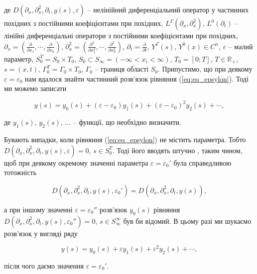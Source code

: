 де $ D(\partial_x, \partial_x^2, \partial_t, y(s), \varepsilon) $ – нелінійний диференціальний оператор у частинних
похідних з постійними коефіцієнтами при похідних, $ L^\Gamma(\partial_x, \partial_x^2) $, $ L^0(\partial_t) $ –
лінійні диференціальні оператори з постійними коефіцієнтами при похідних,
$ \partial_x = \left( \frac{\partial}{\partial x_1},\cdots , \frac{\partial}{\partial x_n}\right) $,
$ \partial_x^2 = \left( \frac{\partial^2}{\partial x_1^2},\cdots , \frac{\partial^2}{\partial x_n^2}\right) $,
$ \partial_t =  \frac{\partial}{\partial t} $,
$ Y^\Gamma(s) $, $Y^0(x) \in C ^n $, $\varepsilon$ – малий параметр,
$ S_0^T = S_0 \times T_0$, $ S_0 \subset S_\infty = \left(-\infty < x_i < \infty \right) $,
$ T_0 = \left[0; T\right] $, $ T \in \mathbb{R}_+ $,
$ s=(x,t) $, $ \Gamma_0^T = \Gamma_0 \times T_0 $, $ \Gamma_0 $  – границя області $ S_0 $.
Припустимо, що при деякому $\varepsilon = \varepsilon_0$ нам вдалося знайти частинний розв’язок рівняння (\ref{eq:eq_epsylon}). Тоді ми можемо записати

\begin{equation}
  \label{eq:eq_sol_epsylon}
  y(s) = y_0(s) + (\varepsilon - \varepsilon_0)y_1(s) + (\varepsilon - \varepsilon_0)^2y_2(s) + \cdots,
\end{equation}

де $y_1(s)$, $y_2(s)$, $\ldots$ – функції, що необхідно визначити.

Бувають випадки, коли рівняння (\ref{eq:eq_epsylon}) не містить параметра.
Тобто \\ $D(\partial_x, \partial_x^2, \partial_t, y(s), \varepsilon) = 0$, $s\in S_0^T$.
Тоді його вводять штучно \cite{Kozdoba-Reshenie}, таким чином, щоб при деякому окремому значенні параметра
$\varepsilon = \varepsilon_0'$ була справедливою тотожність

$$
D(\partial_x, \partial_x^2, \partial_t, y(s), \varepsilon_0') = D(\partial_x, \partial_x^2, \partial_t, y(s)),
$$

а при іншому значенні $\varepsilon = \varepsilon_0''$ розв’язок $y_0(s)$ рівняння
$D(\partial_x, \partial_x^2, \partial_t, y(s), \varepsilon_0'') = 0 $, $s \in S_\infty^\infty $ був би відомий.
В цьому разі ми шукаємо розв’язок у вигляді ряду

\begin{equation}
  \label{eq:solution_as_riad}
y(s) = y_0(s) + \varepsilon y_1(s) + \varepsilon^2 y_2(s) + \cdots,
\end{equation}

після чого даємо значення $ \varepsilon = \varepsilon_0' $.


